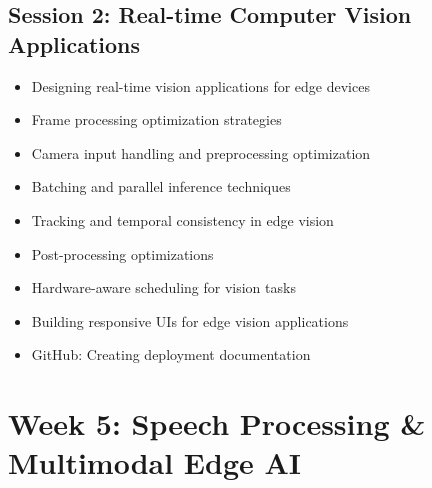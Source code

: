 \documentclass[11pt]{article}
\begin{document}
	\subsection{Session 2: Real-time Computer Vision Applications}
	\label{subsec:week4-session2}
	\begin{itemize}
		\item Designing real-time vision applications for edge devices
		\item Frame processing optimization strategies
		\item Camera input handling and preprocessing optimization
		\item Batching and parallel inference techniques
		\item Tracking and temporal consistency in edge vision
		\item Post-processing optimizations
		\item Hardware-aware scheduling for vision tasks
		\item Building responsive UIs for edge vision applications
		\item GitHub: Creating deployment documentation
	\end{itemize}
	
	\begin{center}
	\end{center}
	
	\section{Week 5: Speech Processing \& Multimodal Edge AI}
	\label{sec:week5}
	
\end{document}
